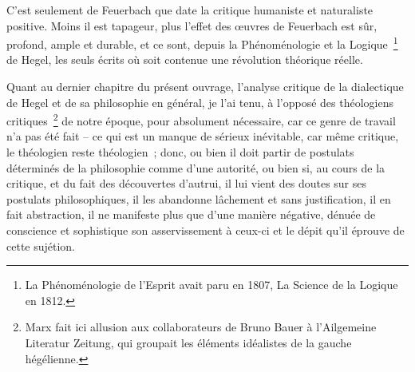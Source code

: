 \documentclass[french,twoside]{book} %
\begin{document}
C’est seulement de Feuerbach que date la critique humaniste et naturaliste positive. Moins il est tapageur, plus l’effet des œuvres de Feuerbach est sûr, profond, ample et durable, et ce sont, depuis la Phénoménologie et la Logique \footnote{La Phénoménologie de l’Esprit avait paru en 1807, La Science de la Logique en 1812.} de Hegel, les seuls écrits où soit contenue une révolution théorique réelle.\par
Quant au dernier chapitre du présent ouvrage, l’analyse critique de la dialectique de Hegel et de sa philosophie en général, je l’ai tenu, à l’opposé des théologiens critiques \footnote{Marx fait ici allusion aux collaborateurs de Bruno Bauer à l’Ailgemeine Literatur Zeitung, qui groupait les éléments idéalistes de la gauche hégélienne.} de notre époque, pour absolument nécessaire, car ce genre de travail n’a pas été fait – ce qui est un manque de sérieux inévitable, car même critique, le théologien reste théologien ; donc, ou bien il doit partir de postulats déterminés de la philosophie comme d’une autorité, ou bien si, au cours de la critique, et du fait des découvertes d’autrui, il lui vient des doutes sur ses postulats philosophiques, il les abandonne lâchement et sans justification, il en fait abstraction, il ne manifeste plus que d’une manière négative, dénuée de conscience et sophistique son asservissement à ceux-ci et le dépit qu’il éprouve de cette sujétion.\par
\end{document}
